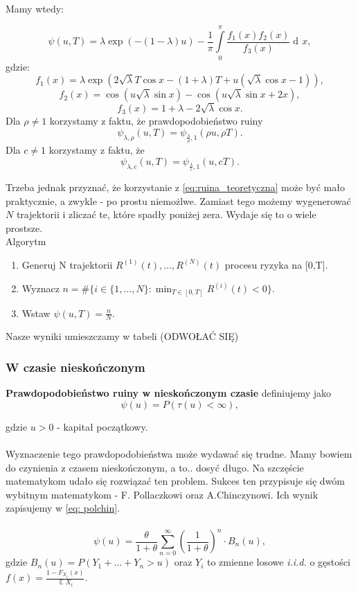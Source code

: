 \documentclass{article}
\theoremstyle{break}
\DeclareMathOperator{\diff}{d\!}
\DeclareMathOperator{\EX}{\mathbb{E}}
\numberwithin{equation}{subsection}
\numberwithin{figure}{section}
\begin{document}
Mamy wtedy:

\begin{equation}
\psi(u,T)=\lambda \exp(-(1-\lambda)u)-\frac{1}{\pi} \int\limits_{0}^{\pi}\frac{f_1(x)f_2(x)}{f_3(x)}\diff{x}, \label{eq:ruina_teoretyczna}
\end{equation}
gdzie:
$$f_1(x)=\lambda \exp(2\sqrt{\lambda}T\cos x - (1+\lambda)T + u(\sqrt{\lambda}\cos x -1)),$$
$$f_2(x)=\cos(u\sqrt{\lambda}\sin x) - \cos(u\sqrt{\lambda}\sin x +2x),$$
$$f_3(x) = 1+\lambda - 2\sqrt{\lambda}\cos x.$$
Dla $\rho\ne1$ korzystamy z faktu, że prawdopodobieństwo ruiny
$$\psi_{\lambda,\rho}(u,T)=\psi_{\frac{\lambda}{\rho},1}(\rho u,\rho T).$$
Dla $c\ne 1$ korzystamy z faktu, że
$$\psi_{\lambda,c}(u,T)=\psi_{\frac{\lambda}{c},1}(u,cT).$$

Trzeba jednak przyznać, że korzystanie z \eqref{eq:ruina_teoretyczna} może być mało praktycznie, a zwykle - po prostu niemożlwe. Zamiast tego możemy wygenerować $N$ trajektorii i zliczać te, które spadły poniżej zera. Wydaje się to o wiele prostsze.\\

Algorytm\\
\begin{enumerate}
	\item Generuj N trajektorii $R^{(1)}(t),\dots,R^{(N)}(t)$ procesu ryzyka na [0,T].
	\item Wyznacz $n=\#\{i\in\{1,\dots,N\}:\min_{T\in[0,T]}R^{(i)}(t)<0\}$.
	\item Wstaw $\psi(u,T)=\frac{n}{N}$.
\end{enumerate}

Nasze wyniki umieszczamy w tabeli (ODWOŁAĆ SIĘ)

\subsubsection{W czasie nieskończonym}

\textbf{Prawdopodobieństwo ruiny w nieskończonym czasie} definiujemy jako\\

\begin{equation}
\psi(u)=P(\tau(u)<\infty),
\end{equation}

gdzie $u > 0$ - kapitał początkowy. \\
\\
Wyznaczenie tego prawdopodobieństwa może wydawać się trudne. Mamy bowiem do czynienia z czasem nieskończonym, a to.. dosyć długo. Na szczęście matematykom udało się rozwiązać ten problem.
Sukces ten przypisuje się dwóm wybitnym matematykom - F. Pollaczkowi oraz A.Chinczynowi. Ich wynik zapisujemy w \eqref{eq: polchin}.
\\\\
\begin{equation}
\psi(u)=\frac{\theta}{1+\theta}\sum_{n=0}^{\infty}\left(\frac{1}{1+\theta}\right)^n\cdot B_n(u), \label{eq: polchin}
\end{equation}
gdzie $B_n(u)=P(Y_1+\dots+Y_n>u)$ oraz $Y_i$ to zmienne losowe \emph{i.i.d.} o gęstości $f(x)=\frac{1-F_{X_i}(x)}{\EX{X_i}}$.\\
\end{document}

